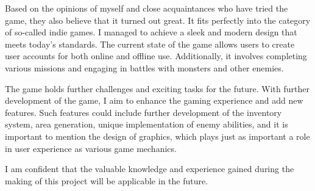 Based on the opinions of myself and close acquaintances who have tried the game, they also believe that it turned out great. It fits perfectly into the category of so-called indie games. I managed to achieve a sleek and modern design that meets today's standards. The current state of the game allows users to create user accounts for both online and offline use. Additionally, it involves completing various missions and engaging in battles with monsters and other enemies.

The game holds further challenges and exciting tasks for the future. With further development of the game, I aim to enhance the gaming experience and add new features. Such features could include further development of the inventory system, area generation, unique implementation of enemy abilities, and it is important to mention the design of graphics, which plays just as important a role in user experience as various game mechanics.

I am confident that the valuable knowledge and experience gained during the making of this project will be applicable in the future.